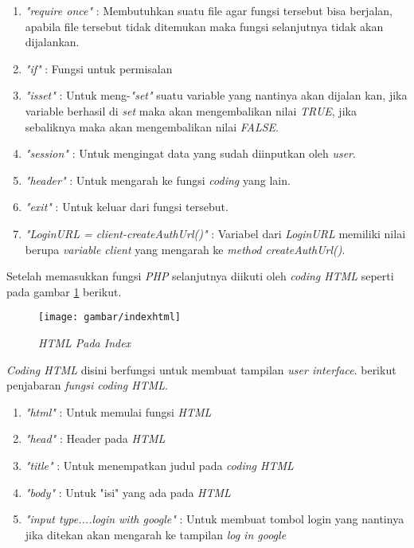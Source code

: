 \begin{enumerate}
\item \textit{"require once"} : Membutuhkan suatu file agar fungsi tersebut bisa berjalan, apabila file tersebut tidak ditemukan maka fungsi selanjutnya tidak akan dijalankan.
\item \textit{"if"} : Fungsi untuk permisalan
\item \textit{"isset"} : Untuk meng-\textit{"set"} suatu variable yang nantinya akan dijalan kan, jika variable berhasil di \textit{set} maka akan mengembalikan nilai \textit{TRUE}, jika sebaliknya maka akan mengembalikan nilai \textit{FALSE}.
\item \textit{"session" }: Untuk mengingat data yang sudah diinputkan oleh \textit{user}.
\item \textit{"header" }: Untuk mengarah ke fungsi \textit{coding} yang lain.
\item \textit{"exit" }: Untuk keluar dari fungsi tersebut.
\item \textit{"LoginURL = client-createAuthUrl()" }: Variabel dari \textit{LoginURL} memiliki nilai berupa \textit{variable client} yang mengarah ke \textit{method createAuthUrl()}.
\end{enumerate}


\par 
Setelah memasukkan fungsi \textit{PHP} selanjutnya diikuti oleh \textit{coding HTML} seperti pada gambar \ref{indexhtml} berikut.

\begin{figure}[!htbp]
    \centering
    \texttt{[image: gambar/indexhtml]}
    \caption{\textit{HTML Pada Index}}
    \label{indexhtml}
\end{figure}
\par 
\textit{Coding HTML} disini berfungsi untuk membuat tampilan \textit{user interface}. berikut penjabaran \textit{fungsi coding HTML}.
\begin{enumerate}
\item \textit{"html"} : Untuk memulai fungsi \textit{HTML}
\item \textit{"head"} : Header pada \textit{HTML}
\item \textit{"title"} : Untuk menempatkan judul pada \textit{coding HTML}
\item \textit{"body"} : Untuk "isi" yang ada pada \textit{HTML}
\item \textit{"input type....login with google"} : Untuk membuat tombol login yang nantinya jika ditekan akan mengarah ke tampilan \textit{ log in google}
\end{enumerate}

